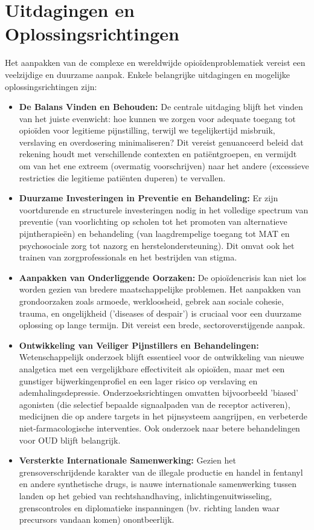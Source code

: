\documentclass[11pt, a4paper]{report} %
\begin{document}
\section{Uitdagingen en Oplossingsrichtingen}
Het aanpakken van de complexe en wereldwijde opioïdenproblematiek vereist een veelzijdige en duurzame aanpak. Enkele belangrijke uitdagingen en mogelijke oplossingsrichtingen zijn:
\begin{itemize}
    \item \textbf{De Balans Vinden en Behouden:} De centrale uitdaging blijft het vinden van het juiste evenwicht: hoe kunnen we zorgen voor adequate toegang tot opioïden voor legitieme pijnstilling, terwijl we tegelijkertijd misbruik, verslaving en overdosering minimaliseren? Dit vereist genuanceerd beleid dat rekening houdt met verschillende contexten en patiëntgroepen, en vermijdt om van het ene extreem (overmatig voorschrijven) naar het andere (excessieve restricties die legitieme patiënten duperen) te vervallen.
    \item \textbf{Duurzame Investeringen in Preventie en Behandeling:} Er zijn voortdurende en structurele investeringen nodig in het volledige spectrum van preventie (van voorlichting op scholen tot het promoten van alternatieve pijntherapieën) en behandeling (van laagdrempelige toegang tot MAT en psychosociale zorg tot nazorg en herstelondersteuning). Dit omvat ook het trainen van zorgprofessionals en het bestrijden van stigma.
    \item \textbf{Aanpakken van Onderliggende Oorzaken:} De opioïdencrisis kan niet los worden gezien van bredere maatschappelijke problemen. Het aanpakken van grondoorzaken zoals armoede, werkloosheid, gebrek aan sociale cohesie, trauma, en ongelijkheid ('diseases of despair') is cruciaal voor een duurzame oplossing op lange termijn. Dit vereist een brede, sectoroverstijgende aanpak.
    \item \textbf{Ontwikkeling van Veiliger Pijnstillers en Behandelingen:} Wetenschappelijk onderzoek blijft essentieel voor de ontwikkeling van nieuwe analgetica met een vergelijkbare effectiviteit als opioïden, maar met een gunstiger bijwerkingenprofiel en een lager risico op verslaving en ademhalingsdepressie. Onderzoeksrichtingen omvatten bijvoorbeeld 'biased' agonisten (die selectief bepaalde signaalpaden van de receptor activeren), medicijnen die op andere targets in het pijnsysteem aangrijpen, en verbeterde niet-farmacologische interventies. Ook onderzoek naar betere behandelingen voor OUD blijft belangrijk.
    \item \textbf{Versterkte Internationale Samenwerking:} Gezien het grensoverschrijdende karakter van de illegale productie en handel in fentanyl en andere synthetische drugs, is nauwe internationale samenwerking tussen landen op het gebied van rechtshandhaving, inlichtingenuitwisseling, grenscontroles en diplomatieke inspanningen (bv. richting landen waar precursors vandaan komen) onontbeerlijk.

\end{itemize}
\end{document}
